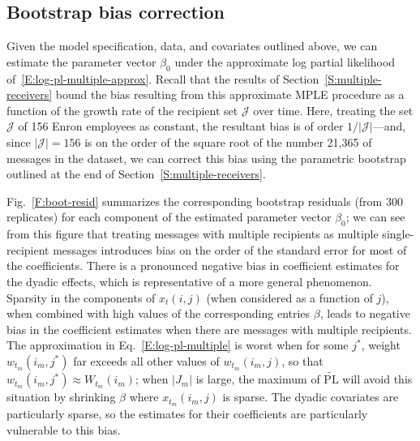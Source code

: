 \documentclass[final]{statsoc}
\begin{document}
\subsection{Bootstrap bias correction}\label{S:enron-bootstrap}

Given the model specification, data, and covariates outlined above, we can
estimate the parameter vector $\beta_0$ under the approximate
log partial likelihood of~\eqref{E:log-pl-multiple-approx}.  Recall
that the results of Section~\ref{S:multiple-receivers} bound the bias
resulting from this approximate MPLE procedure as a function of the growth
rate of the recipient set $\mathcal{J}$ over time.  Here, treating the
set $\mathcal{J}$ of 156 Enron employees as constant, the resultant bias
is of order $1/|\mathcal{J}|$---and, since $|\mathcal{J}| = 156$ is on the
order of the square root of the number 21,365 of messages in the dataset,
we can correct this bias using the parametric bootstrap outlined at the
end of Section~\ref{S:multiple-receivers}.

Fig.~\ref{F:boot-resid} summarizes the corresponding bootstrap residuals (from
$300$ replicates) for each component of the estimated parameter vector
$\beta_0$; we can see from this figure that treating messages with multiple
recipients as multiple single-recipient messages introduces bias on the order of the
standard error for most of the coefficients.  There is a pronounced negative
bias in coefficient estimates for the dyadic effects, which is representative
of a more general phenomenon.  Sparsity in the components of $x_{t}(i,j)$
(when considered as a function of $j$), when combined with high values of the
corresponding entries $\beta$, leads to negative bias in the coefficient
estimates when there are messages with multiple recipients.  The approximation
in Eq.~\eqref{E:log-pl-multiple} is worst when for some $j^\ast$, weight
$w_{t_m}(i_m,j^\ast)$ far exceeds all other values of $w_{t_m}(i_m,j)$, so
that $w_{t_m}(i_m, j^\ast) \approx W_{t_m}(i_m)$; when $|J_m|$ is large, the
maximum of $\widetilde{\mathrm{PL}}$ will avoid this situation by shrinking
$\beta$ where $x_{t_m}(i_m, j)$ is sparse.  The dyadic covariates are
particularly sparse, so the estimates for their coefficients are particularly
vulnerable to this bias.
\end{document}
